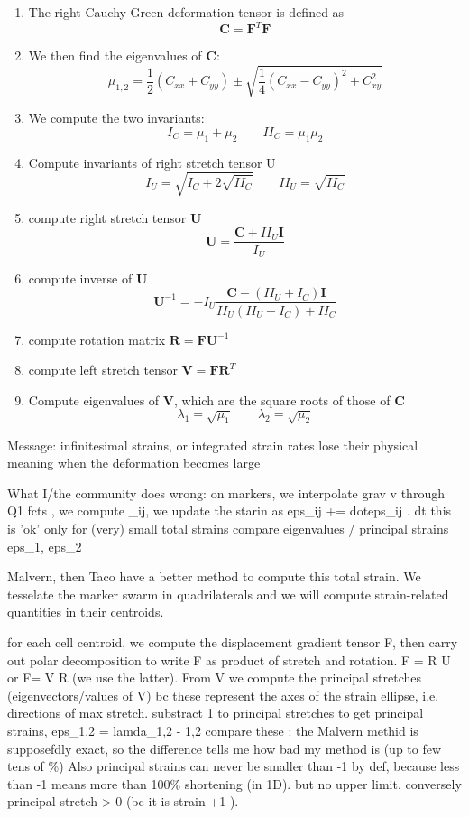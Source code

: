\begin{enumerate}
\item The right Cauchy-Green deformation tensor is defined as
\[
{\bm C} = {\bm F}^T {\bm F}
\]
\item 
We then find the eigenvalues of ${\bm C}$:
\[
\mu_{1,2} = \frac{1}{2}(C_{xx}+C_{yy}) \pm \sqrt{ \frac{1}{4}(C_{xx}-C_{yy})^2 + C_{xy}^2   }
\]
\item We compute the two invariants:
\[
I_C = \mu_1+\mu_2 \qquad II_C = \mu_1\mu_2 
\]
\item Compute invariants of right stretch tensor U
\[
I_U=\sqrt{I_C+2\sqrt{II_C}}
\qquad
II_U=\sqrt{II_C}
\]
\item compute right stretch tensor ${\bm U}$
\[
{\bm U} = \frac{{\bm C}+ II_U {\bm I}}{I_U}
\]
\item compute inverse of ${\bm U}$
\[
{\bm U}^{-1} = - I_U \frac{{\bm C}- (II_U+I_C){\bm I}}{II_U(II_U+I_C)+II_C}
\]
\item compute rotation matrix ${\bm R}={\bm F}{\bm U}^{-1}$

\item compute left stretch tensor ${\bm V}={\bm F}{\bm R}^T$

\item Compute eigenvalues of ${\bm V}$, which are the square roots of those of ${\bm C}$
\[
\lambda_1 = \sqrt{\mu_1}
\qquad
\lambda_2 = \sqrt{\mu_2}
\]


\end{enumerate}



Message:
infinitesimal strains, or integrated strain rates lose their physical meaning when 
the deformation becomes large

What I/the community does wrong:
on markers, we interpolate grav v through Q1 fcts , we compute _ij, we
update the starin as eps_ij += dot{eps}_ij . dt 
this is 'ok' only for (very) small total strains 
compare eigenvalues / principal strains eps_1, eps_2  


Malvern, then Taco have a better method to compute this total strain. 
We tesselate the marker swarm in quadrilaterals and we will compute
strain-related quantities in their centroids.

for each cell centroid, we compute the displacement gradient tensor F, 
then carry out polar decomposition to write F as product of stretch and rotation. 
F = R U  or F=  V R (we use the latter).
From V we compute the principal stretches (eigenvectors/values of V) bc
these represent the axes of the strain ellipse, i.e. directions of max stretch.
substract 1 to principal stretches to get principal strains, eps_1,2 = lamda_1,2 - 1,2 
compare these : the Malvern methid is supposefdly exact, so the difference tells me 
how bad my method is (up to few tens of \%) 
Also principal strains can never be smaller than -1 by def, because less than -1 means
more than 100\%  shortening (in 1D). but no upper limit.
conversely principal stretch > 0 (bc it is strain +1 ).







